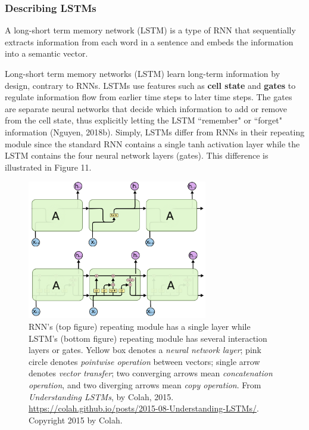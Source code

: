 \subsubsection{Describing LSTMs}
A long-short term memory network (LSTM) is a type of RNN that sequentially extracts information from each word in a sentence and embeds the information into a semantic vector. 

Long-short term memory networks (LSTM) learn long-term information by design, contrary to RNNs. LSTMs use features such as \textbf{cell state} and \textbf{gates} to regulate information flow from earlier time steps to later time steps. The gates are separate neural networks that decide which information to add or remove from the cell state, thus explicitly letting the LSTM ``remember" or ``forget" information (Nguyen, 2018b). Simply, LSTMs differ from RNNs in their repeating module since the standard RNN contains a single $\text{tanh}$ activation layer while the LSTM contains the four neural network layers (gates). This difference is illustrated in Figure 11.


\begin{figure}[h]
\centering
\includegraphics[width=0.7\textwidth]{imgs/rnn_vs_lstm_cells.png}
\caption{RNN's (top figure) repeating module has a single layer while LSTM's (bottom figure) repeating module has several interaction layers or gates. Yellow box denotes a \emph{neural network layer}; pink circle denotes \emph{pointwise operation} between vectors; single arrow denotes \emph{vector transfer}; two converging arrows mean \emph{concatenation operation}, and two diverging arrows mean \emph{copy operation}. From \emph{Understanding LSTMs}, by Colah, 2015. \url{https://colah.github.io/posts/2015-08-Understanding-LSTMs/}. Copyright 2015 by Colah.}
\end{figure}

